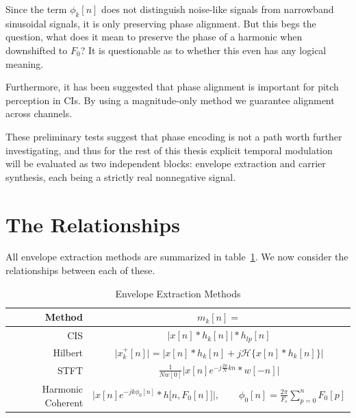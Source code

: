 \documentclass [11pt, proquest,oneside] {ganter_thesis}[2015/03/03]
\begin{document}
Since the term $\phi_k[n]$ does not distinguish noise-like signals from narrowband sinusoidal signals, it is only preserving phase alignment.  But this begs the question, what does it mean to preserve the phase of a harmonic when downshifted to $F_0$?  It is questionable as to whether this even has any logical meaning.


Furthermore, it has been suggested \cite{laneau2006improved} that phase alignment is important for pitch perception in CIs.  By using a magnitude-only method we guarantee alignment across channels.


These preliminary tests suggest that phase encoding is not a path worth further investigating, and thus for the rest of this thesis explicit temporal modulation will be evaluated as two independent blocks: envelope extraction and carrier synthesis, each being a strictly real nonnegative signal.

\section{The Relationships}

All envelope extraction methods are summarized in table~\ref{table:envelope_extraction_methods}.  We now consider the relationships between each of these.

\begin{table}
\begin{center}
\bgroup
\def\arraystretch{1.7}
\begin{tabular}{| r | c |}
  \hline
  \textbf{Method} & $m_k[n] = $ \\ \hline
  CIS & $\Big| x[n] * h_k[n] \Big| * h_{lp}[n]$ \\ \hline
  Hilbert & $\Big| x^+_k[n] \Big| = \Big| x[n] * h_k[n] + j\mathcal{H}\{x[n] * h_k[n]\} \Big|$ \\ \hline
  STFT & $\frac{1}{Nw[0]}  \Big\vert x[n] e^{-j\frac{2\pi}{N}kn} * w[-n] \Big\vert$ \\ \hline
  Harmonic Coherent & $\Big| x[n] e^{-jk\phi_0 [n]} * h\big[n, F_0[n] \big] \Big|, \qquad \phi_0[n] = \frac{2\pi}{F_s} \sum_{p=0}^{n} F_0[p]$ \\ \hline
\end{tabular}
\egroup
\end{center}
\caption{Envelope Extraction Methods}\label{table:envelope_extraction_methods}
\end{table}
\end{document}
